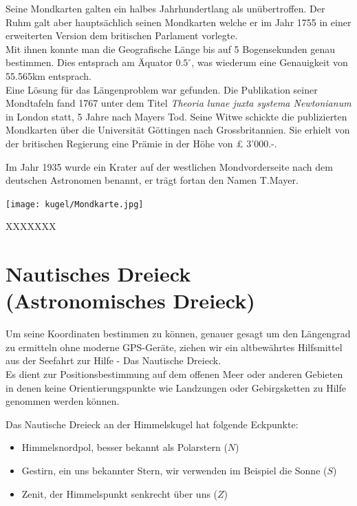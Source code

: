 \begin{refsection}
\begin{refsection}
Seine Mondkarten galten ein halbes Jahrhundertlang als unübertroffen. Der Ruhm galt aber hauptsächlich seinen Mondkarten welche er im Jahr 1755 in einer erweiterten Version dem britischen Parlament vorlegte.\\
Mit ihnen konnte man die Geografische Länge bis auf 5 Bogensekunden genau bestimmen. Dies entsprach am Äquator $0.5 ^{\circ}$, was wiederum eine Genauigkeit von 55.565km entsprach.\\
Eine Lösung für das Längenproblem war gefunden. Die Publikation seiner Mondtafeln fand 1767 unter dem Titel \textit{Theoria lunae juxta systema Newtonianum} in London statt, 5 Jahre nach Mayers Tod. 
Seine Witwe schickte die publizierten Mondkarten über die Universität Göttingen nach Grossbritannien. Sie erhielt von der britischen Regierung eine Prämie in der Höhe von £ 3’000.-.

Im Jahr 1935 wurde ein Krater auf der westlichen Mondvorderseite nach dem deutschen Astronomen benannt, er trägt fortan den Namen T.Mayer.

\begin{center}
        \texttt{[image: kugel/Mondkarte.jpg]}
\end{center}




XXXXXXX


\section{Nautisches Dreieck (Astronomisches Dreieck)}
Um seine Koordinaten bestimmen zu können, genauer gesagt um den Längengrad zu ermitteln ohne moderne GPS-Geräte, ziehen wir ein altbewährtes Hilfsmittel aus der Seefahrt zur Hilfe - Das Nautische Dreieck. \\
Es dient zur Positionsbestimmung auf dem offenen Meer oder anderen Gebieten in denen keine Orientierungspunkte wie Landzungen oder Gebirgsketten zu Hilfe genommen werden können.

Das Nautische Dreieck an der Himmelskugel hat folgende Eckpunkte:
\begin{itemize}
\item Himmelsnordpol, besser bekannt als Polarstern ($N$)
\item Gestirn, ein uns bekannter Stern, wir verwenden im Beispiel die Sonne ($S$)
\item Zenit, der Himmelspunkt senkrecht über uns ($Z$)
\end{itemize}


\end{refsection}
\end{refsection}
